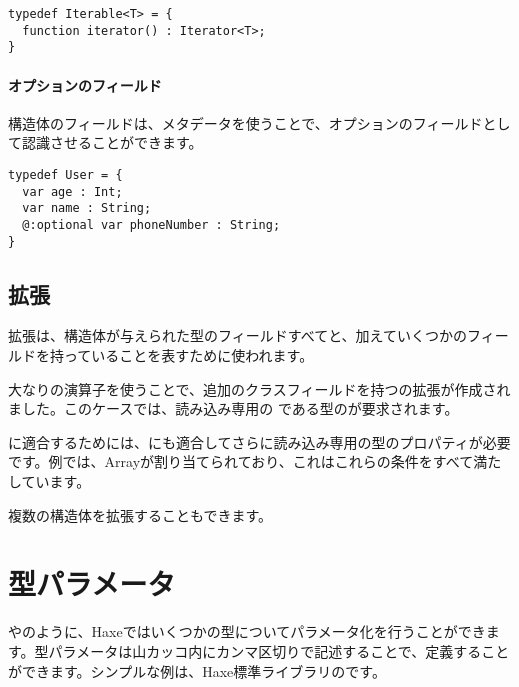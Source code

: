 \begin{lstlisting}
typedef Iterable<T> = {
  function iterator() : Iterator<T>;
}
\end{lstlisting}

\paragraph{オプションのフィールド}
構造体のフィールドは、メタデータを使うことで、オプションのフィールドとして認識させることができます。

\begin{lstlisting}
typedef User = {
  var age : Int;
  var name : String;
  @:optional var phoneNumber : String;
}
\end{lstlisting}

\subsection{拡張}
\label{type-system-extensions}


拡張は、構造体が与えられた型のフィールドすべてと、加えていくつかのフィールドを持っていることを表すために使われます。

大なりの演算子を使うことで、追加のクラスフィールドを持つの拡張が作成されました。このケースでは、読み込み専用の である型のが要求されます。 

に適合するためには、にも適合してさらに読み込み専用の型のプロパティが必要です。例では、Arrayが割り当てられており、これはこれらの条件をすべて満たしています。

複数の構造体を拡張することもできます。


\section{型パラメータ}
\label{type-system-type-parameters}

やのように、Haxeではいくつかの型についてパラメータ化を行うことができます。型パラメータは山カッコ\expr{$<>$}内にカンマ区切りで記述することで、定義することができます。シンプルな例は、Haxe標準ライブラリのです。

